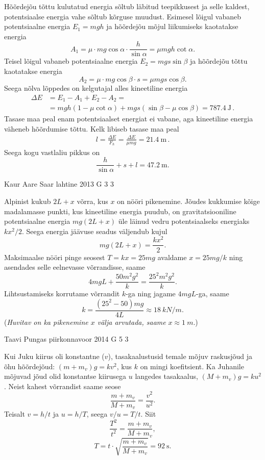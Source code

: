 \documentclass[11pt, twoside]{article}
\begin{document}
{{\ifSolution
Hõõrdejõu tõttu kulutatud energia sõltub läbitud teepikkusest ja selle kaldest, potentsiaalse energia vahe sõltub kõrguse muudust. Esimesel lõigul vabaneb potentsiaalne energia \(E_1 = mgh\) ja hõõrdejõu mõjul liikumiseks kaotatakse energia
\[
A_1 = \mu \cdot mg\cos\alpha \cdot \frac{h}{\sin\alpha} = \mu mgh \cot\alpha.
\]
Teisel lõigul vabaneb potentsiaalne energia \(E_2 = mgs \sin\beta\) ja hõõrdejõu tõttu kaotatakse energia
\[
A_2 = \mu \cdot mg \cos \beta \cdot s = \mu mgs \cos \beta.
\]
Seega nõlva lõppedes on kelgutajal alles kineetiline energia
\begin{align*}
\Delta E &= E_1 - A_1 + E_2 - A_2 = \\
&= mgh(1-\mu\cot\alpha) + mgs(\sin\beta - \mu\cos\beta) = \SI{787.4}{\joule} \, .
\end{align*}
Tasase maa peal enam potentsiaalset energiat ei vabane, aga kineetiline energia väheneb hõõrdumise tõttu. Kelk libiseb tasase maa peal
\begin{align*}
l = \frac{\Delta E}{F_h} = \frac{\Delta E}{\mu mg} = \SI{21.4}{\meter} \, .
\end{align*}
Seega kogu vastlaliu pikkus on
\[
\frac{h}{\sin\alpha} + s + l = \SI{47.2}{\meter}.
\]
\fi
}

{Kaur Aare Saar} %
{lahtine} %
{2013} %
{G 3} %
{3} %
{

\ifSolution
Alpinist kukub $2L+x$ võrra, kus $x$ on nööri pikenemine. Jõudes kukkumise kõige madalamasse punkti, kus kineetiline energia puudub, on gravitatsiooniline potentsiaalne energia $mg(2L+x)$ üle läinud vedru potentsiaalseks energiaks $kx^2/2$. Seega energia jäävuse seadus väljendub kujul
\[mg(2L+x)=\frac{kx^2}{2}.\]
Maksimaalse nööri pinge seosest $T=kx=25mg$ avaldame $x=25mg/k$ ning asendades selle eelnevasse võrrandisse, saame
\[4mgL+\frac{50m^2g^2}{k}=\frac{25^2m^2g^2}{k}.\]
Lihtsustamiseks korrutame võrrandit $k$-ga ning jagame $4mgL$-ga, saame
\[k=\frac{(25^2-50)mg}{4L}\approx \SI{18}{kN/m}.\]
({\em Huvitav on ka pikenemine $x$ välja arvutada, saame} $x\approx \SI{1}{m}$.)
\fi
}

{Taavi Pungas} %
{piirkonnavoor} %
{2014} %
{G 5} %
{3} %
{

\ifSolution
Kui Juku kiirus oli konstantne ($v$), tasakaalustusid temale mõjuv raskusjõud ja õhu hõõrdejõud: $(m+m_v)g=kv^2$, kus $k$ on mingi koefitsient. Ka Juhanile mõjuvad jõud olid konstantse kiirusega $u$ langedes tasakaalus, $(M+m_v)g=ku^2$. Neist kahest võrrandist saame seose \[\frac{m+m_v}{M+m_v}=\frac{v^2}{u^2}.\] Teisalt $v=h/t$ ja $u=h/T$, seega $v/u=T/t$. Siit
\[\frac{T^2}{t^2}=\frac{m+m_v}{M+m_v},\]
\[T=t \cdot \sqrt{\frac{m+m_v}{M+m_v}}=\SI{92}{\s}.\]
\fi
}

}
\end{document}
